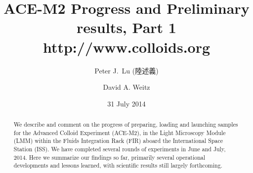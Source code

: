 \documentclass[
twocolumn,
rmp,aps,10pt]{revtex4-1}
\begin{document}
\begin{CJK*}{UTF8}{}

\title{ACE-M2 Progress and Preliminary results, Part 1 \\
http://www.colloids.org}
\author{Peter J.~Lu (陸述義)}
\author{David A. Weitz}

\date{31 July 2014}
\begin{abstract}
We describe and comment on the progress of preparing, loading and launching
samples for the Advanced Colloid Experiment (ACE-M2), in the Light Microscopy
Module (LMM) within the Fluids Integration Rack (FIR) aboard the International
Space Station (ISS). We have completed several rounds of experiments in June and July,
2014. Here we summarize our findings so far, primarily several operational
developments and lessons learned, with scientific results still largely
forthcoming.
\end{abstract}
\maketitle
\end{CJK*}

\tableofcontents

\clearpage












\end{document}
